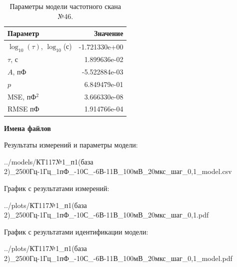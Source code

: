 \begin{table}[!ht]
    \centering
    \caption{Параметры модели частотного скана №46.}
    \begin{tabular}{|l|r|}
        \hline
        Параметр                                       & Значение                  \\ \hline
        $\log_{10}(\tau)$, $\log_{10}$(с)              & -1.721330e+00             \\ \hline
        $\tau$, с                                      & 1.899636e-02              \\ \hline
        $A$, пФ                                        & -5.522884e-03             \\ \hline
        $p$                                            & 6.849479e-01              \\ \hline
        MSE, пФ$^2$                                    & 3.666330e-08              \\ \hline
        RMSE пФ                                        & 1.914766e-04              \\ \hline
    \end{tabular}
    \label{table:frequency_scan_model_46}
\end{table}

\textbf{Имена файлов}

Результаты измерений и параметры модели:

\scriptsize../models/КТ117№1\_п1(база 2)\_2500Гц-1Гц\_1пФ\_-10С\_-6В-11В\_100мВ\_20мкс\_шаг\_0,1\_model.csv
\normalsize

График с результатами измерений:

\scriptsize../plots/КТ117№1\_п1(база 2)\_2500Гц-1Гц\_1пФ\_-10С\_-6В-11В\_100мВ\_20мкс\_шаг\_0,1.pdf
\normalsize

График с результатами идентификации модели:

\scriptsize../plots/КТ117№1\_п1(база 2)\_2500Гц-1Гц\_1пФ\_-10С\_-6В-11В\_100мВ\_20мкс\_шаг\_0,1\_model.pdf
\normalsize

